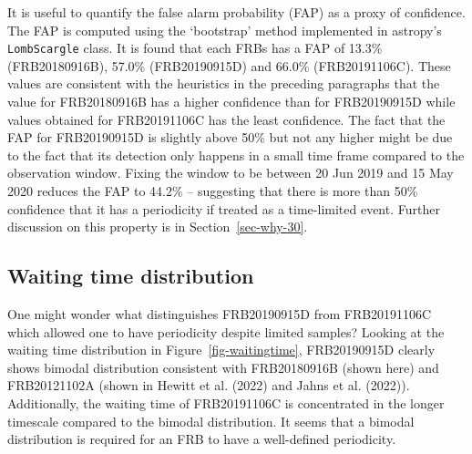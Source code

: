\documentclass[
  rmp,
  amsmath,
  amssymb,
  preprint]{revtex4-2}
\begin{document}
It is useful to quantify the false alarm probability (FAP) as a proxy of
confidence. The FAP is computed using the `bootstrap' method implemented
in astropy's \texttt{LombScargle} class. It is found that each FRBs has
a FAP of 13.3\% (FRB20180916B), 57.0\% (FRB20190915D) and 66.0\%
(FRB20191106C). These values are consistent with the heuristics in the
preceding paragraphs that the value for FRB20180916B has a higher
confidence than for FRB20190915D while values obtained for FRB20191106C
has the least confidence. The fact that the FAP for FRB20190915D is
slightly above 50\% but not any higher might be due to the fact that its
detection only happens in a small time frame compared to the observation
window. Fixing the window to be between 20 Jun 2019 and 15 May 2020
reduces the FAP to 44.2\% -- suggesting that there is more than 50\%
confidence that it has a periodicity if treated as a time-limited event.
Further discussion on this property is in Section~\ref{sec-why-30}.

\hypertarget{waiting-time-distribution}{%
\subsection{Waiting time distribution}\label{waiting-time-distribution}}

One might wonder what distinguishes FRB20190915D from FRB20191106C which
allowed one to have periodicity despite limited samples? Looking at the
waiting time distribution in Figure~\ref{fig-waitingtime}, FRB20190915D
clearly shows bimodal distribution consistent with FRB20180916B (shown
here) and FRB20121102A (shown in Hewitt et al. (2022) and Jahns et al.
(2022)). Additionally, the waiting time of FRB20191106C is concentrated
in the longer timescale compared to the bimodal distribution. It seems
that a bimodal distribution is required for an FRB to have a
well-defined periodicity.
\end{document}
